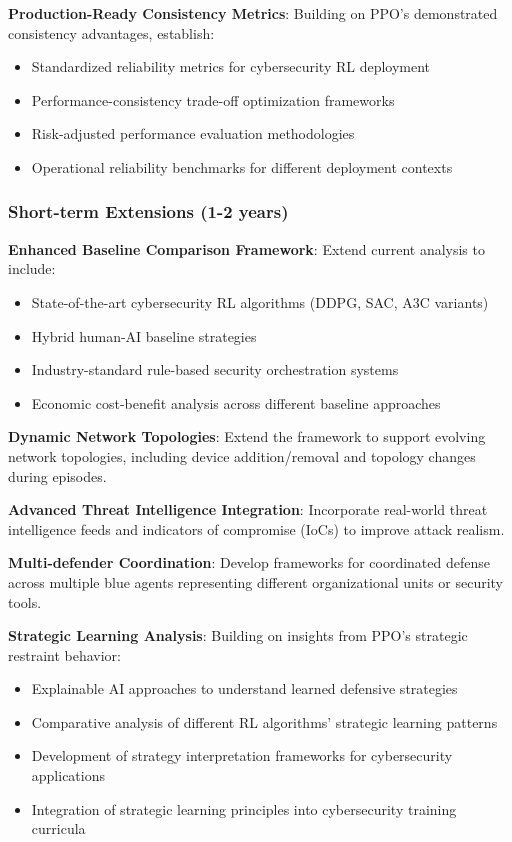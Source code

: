 \documentclass[12pt,oneside]{article}
\begin{document}
\textbf{Production-Ready Consistency Metrics}: Building on PPO's demonstrated consistency advantages, establish:
\begin{itemize}
\item Standardized reliability metrics for cybersecurity RL deployment
\item Performance-consistency trade-off optimization frameworks
\item Risk-adjusted performance evaluation methodologies
\item Operational reliability benchmarks for different deployment contexts
\end{itemize}

\subsubsection{Short-term Extensions (1-2 years)}

\textbf{Enhanced Baseline Comparison Framework}: Extend current analysis to include:
\begin{itemize}
\item State-of-the-art cybersecurity RL algorithms (DDPG, SAC, A3C variants)
\item Hybrid human-AI baseline strategies
\item Industry-standard rule-based security orchestration systems
\item Economic cost-benefit analysis across different baseline approaches
\end{itemize}

\textbf{Dynamic Network Topologies}: Extend the framework to support evolving network topologies, including device addition/removal and topology changes during episodes.

\textbf{Advanced Threat Intelligence Integration}: Incorporate real-world threat intelligence feeds and indicators of compromise (IoCs) to improve attack realism.

\textbf{Multi-defender Coordination}: Develop frameworks for coordinated defense across multiple blue agents representing different organizational units or security tools.

\textbf{Strategic Learning Analysis}: Building on insights from PPO's strategic restraint behavior:
\begin{itemize}
\item Explainable AI approaches to understand learned defensive strategies
\item Comparative analysis of different RL algorithms' strategic learning patterns
\item Development of strategy interpretation frameworks for cybersecurity applications
\item Integration of strategic learning principles into cybersecurity training curricula
\end{itemize}
\end{document}
